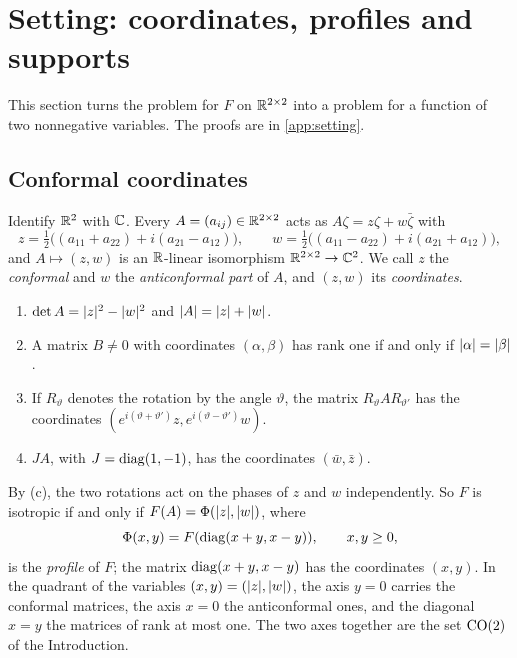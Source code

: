 \section{Setting: coordinates, profiles and supports}\label{sec:setting}

This section turns the problem for $F$ on $\mathbb{R}^{2\times 2}$ into a problem for a function of two nonnegative
variables. The proofs are in \cref{app:setting}.

\subsection{Conformal coordinates}\label{sec:coordinates}

Identify $\mathbb{R}^2$ with $\mathbb{C}$. Every $A=(a_{ij})\in\mathbb{R}^{2\times 2}$ acts as $A\zeta=z\zeta+w\bar\zeta$ with
\[
  z=\tfrac12\bigl((a_{11}+a_{22})+i(a_{21}-a_{12})\bigr),\qquad
  w=\tfrac12\bigl((a_{11}-a_{22})+i(a_{21}+a_{12})\bigr),
\]
and $A\mapsto(z,w)$ is an $\mathbb{R}$-linear isomorphism $\mathbb{R}^{2\times 2}\to\mathbb{C}^2$. We call $z$ the \emph{conformal}
and $w$ the \emph{anticonformal part} of $A$, and $(z,w)$ its \emph{coordinates}.

\begin{lemma}\label{lem:coordinates}
\begin{enumerate}[label=\textup{(\alph*)}]
\item $\det A=\lvert z\rvert^2-\lvert w\rvert^2$ and $\lvert A\rvert=\lvert z\rvert+\lvert w\rvert$.
\item A matrix $B\ne0$ with coordinates $(\alpha,\beta)$ has rank one if and only if
  $\lvert \alpha\rvert=\lvert \beta\rvert$.
\item If $R_\vartheta$ denotes the rotation by the angle $\vartheta$, the matrix
  $R_\vartheta AR_{\vartheta'}$ has the coordinates
  $(e^{i(\vartheta+\vartheta')}z,e^{i(\vartheta-\vartheta')}w)$.
\item $JA$, with $J=\operatorname{diag}(1,-1)$, has the coordinates $(\bar w,\bar z)$.
\end{enumerate}
\end{lemma}

By (c), the two rotations act on the phases of $z$ and $w$ independently. So $F$ is isotropic if
and only if $F(A)=\Phi(\lvert z\rvert,\lvert w\rvert)$, where
\[
  \Phi(x,y)=F(\operatorname{diag}(x+y,x-y)),\qquad x,y\ge0,
\]
is the \emph{profile} of $F$; the matrix $\operatorname{diag}(x+y,x-y)$ has the coordinates $(x,y)$. In the
quadrant of the variables $(x,y)=(\lvert z\rvert,\lvert w\rvert)$, the axis $y=0$ carries the conformal
matrices, the axis $x=0$ the anticonformal ones, and the diagonal $x=y$ the matrices of rank at
most one. The two axes together are the set $\mathrm{CO}(2)$ of the Introduction.

